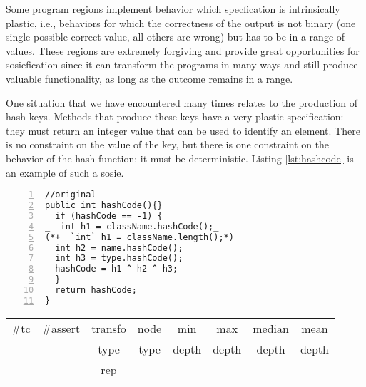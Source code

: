 Some program regions implement behavior which specfication is intrinsically plastic, i.e., behaviors for which the correctness of the output is not binary (one single possible correct value, all others are wrong) but has to be in a range of values. 
These regions are extremely forgiving and provide great opportunities for sosiefication since it can transform the programs in many ways and still produce valuable functionality, as long as the outcome remains in a range. 

One situation that we have encountered many times relates to the production of hash keys.
Methods that produce these keys have a very plastic specification: they must return an integer value that can be used to identify an element. There is no constraint on the value of the key, but there is one constraint on the behavior of the hash function: it must be deterministic.
Listing \ref{lst:hashcode} is an example of such a sosie.

\begin{minipage}{\columnwidth}
\begin{lstlisting}[caption={\texttt{hashCode} in Rhino and a sosie},label={lst:hashcode},numbers=left]
//original
public int hashCode(){}
  if (hashCode == -1) {
_- int h1 = className.hashCode();_
(*+  `int` h1 = className.length();*)
  int h2 = name.hashCode();
  int h3 = type.hashCode();
  hashCode = h1 ^ h2 ^ h3;
  }
  return hashCode;
}
\end{lstlisting}
\tabcolsep=0.11cm
\begin{tabular}{>{\small}c>{\small}c>{\small}c>{\small}c>{\small}c>{\small}c>{\small}c>{\small}c}
\hline
\rowcolor{lightgray} \#tc & \#assert & transfo & node & min & max & median & mean   \\
\rowcolor{lightgray}  & & type & type & depth  & depth & depth & depth  \\ 
\hline
&  & rep &  &  &  &  & \\
\hline
\end{tabular}
\end{minipage}


